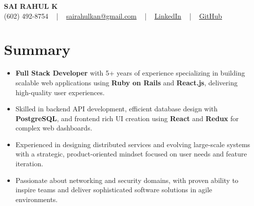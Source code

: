 \documentclass[letterpaper,11pt]{article}
\newcommand{\resumeItem}[1]{
  \item\footnotesize{
    {#1 \vspace{-2pt}}
  }
}
\newcommand{\resumeItemListStart}{\begin{itemize}[leftmargin=*]}
\newcommand{\resumeItemListEnd}{\end{itemize}\vspace{-5pt}}
\begin{document}
\begin{center}
    {\fontsize{14pt}{12pt}\selectfont \textbf{\MakeUppercase{Sai Rahul K}}}\\ \vspace{2pt}
    \fontsize{10pt}{12pt}\selectfont (602) 492-8754 ~ | ~ \href{mailto:sairahulkan@gmail.com}{sairahulkan@gmail.com} ~ | ~
    \href{https://www.linkedin.com/in/rq123/}{\color{blue}\underline{LinkedIn}} ~ | ~
    \href{https://github.com/kanrahuldo}{\color{blue}\underline{GitHub}}~
    \vspace{-8pt}
\end{center}

\section{Summary}
\fontsize{9pt}{10pt}\selectfont
\resumeItemListStart
    \resumeItem{\textbf{Full Stack Developer} with 5+ years of experience specializing in building scalable web applications using \textbf{Ruby on Rails} and \textbf{React.js}, delivering high-quality user experiences.} \vspace{-3pt}
    \resumeItem{Skilled in backend API development, efficient database design with \textbf{PostgreSQL}, and frontend rich UI creation using \textbf{React} and \textbf{Redux} for complex web dashboards.} \vspace{-3pt}
    \resumeItem{Experienced in designing distributed services and evolving large-scale systems with a strategic, product-oriented mindset focused on user needs and feature iteration.} \vspace{-3pt}
    \resumeItem{Passionate about networking and security domains, with proven ability to inspire teams and deliver sophisticated software solutions in agile environments.} \vspace{-3pt}
\resumeItemListEnd
\vspace{-6pt}
\end{document}
